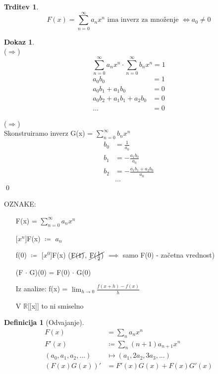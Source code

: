 \documentclass[a4paper,12pt]{article}
\theoremstyle{definition}
\newtheorem{defn}[counter]{Definicija}
\newtheorem{claim}[counter]{Trditev}
\newtheorem{pro}[counter]{Dokaz}
\theoremstyle{remark}
\newcommand{\R}{\mathbb{R}}
\begin{document}
\begin{claim}
    \[F(x) = \sum_{n = 0}^{\infty} a_n x^n \text{ ima inverz za množenje } \iff a_0 \neq 0\]
\end{claim}

\begin{pro}\mbox{}\\
    ($\Longrightarrow$)\\
    \[\sum_{n = 0}^{\infty} a_n x^n \cdot \sum_{n = 0}^{\infty} b_n x^n = 1\]
    \begin{align*}
        a_0 b_0 &= 1\\
        a_0 b_1 + a_1 b_0 &= 0\\
        a_0 b_2 + a_1 b_1 + a_2 b_0 &= 0\\
        ... &= 0
    \end{align*}
    
    ($\Longrightarrow$)\\
    Skonstruiramo inverz G(x) = $\displaystyle \sum_{n = 0}^{\infty} b_n x^n$
    \begin{align*}
        b_0 &= \frac{1}{a_0}\\
        b_1 &= -\frac{a_1 b_0}{a_0}\\
        b_2 &= - \frac{a_1 b_1 + a_2 b_0}{a_0}\\
        &...
    \end{align*}
    \qed
\end{pro}
OZNAKE:
\begin{itemize}
    \item[] F(x) = $\displaystyle \sum_{n = 0}^{\infty} a_n x^n$
    \item[] [$x^n$]F(x) $\coloneqq$ $a_n$
    \item[] f(0) $\coloneqq$ [$x^0$]F(x) ($\cancel{\text{F(1)}}$, $\cancel{\text{F(}\frac{1}{2}\text{)}}$ $\implies$ samo F(0) - začetna vrednost) 
    \item[] (F $\cdot$ G)(0) = F(0) $\cdot$ G(0)
    \item[] Iz analize: f(x) = $\lim_{h \to 0} \frac{f(x + h) - f(x)}{h}$
    \item[] V $\R$[[x]] to ni smiselno
\end{itemize}

\begin{defn}[Odvajanje]
    \begin{align*}
        F(x) &= \sum_n a_n x^n\\
        F'(x) &\coloneqq \sum_n (n + 1) a_{n + 1} x^n\\
        (a_0, a_1, a_2, ...) &\longmapsto (a_1, 2a_2, 3a_3, ...)\\
        (F(x) G(x))' &= F'(x) G(x) + F(x) G'(x)
    \end{align*}
\end{defn}
\end{document}
